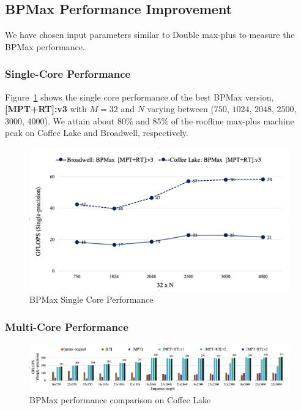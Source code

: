 \subsection{BPMax Performance Improvement}
We have chosen input parameters similar to Double max-plus to measure the BPMax performance.

\subsubsection{Single-Core Performance}
Figure~\ref{fig:st_performance_analysis_bpmax} shows the single core performance of the best BPMax version, \textbf{[MPT+RT]:v3} with $M=32$ and $N$ varying between ($750$, $1024$, $2048$, $2500$, $3000$, $4000$). We attain about 80\% and 85\% of the roofline max-plus machine peak on Coffee Lake and Broadwell, respectively.
\begin{figure}[htbp]
\centerline{\includegraphics[scale=0.38, trim=5 5 5 5,clip]{content/figures/bpmax_single_core_new.png}}
\caption{BPMax Single Core Performance}
\label{fig:st_performance_analysis_bpmax}
\end{figure}

\subsubsection{Multi-Core Performance}

\begin{figure}[htbp]
\centerline{\includegraphics[width=\textwidth,scale=1.00, trim=5 5 5 5,clip]{content/figures/bpm_performance_new_tile.png}} 
\caption{BPMax performance comparison on Coffee Lake}
\label{fig:bpm_performance}
\end{figure}

